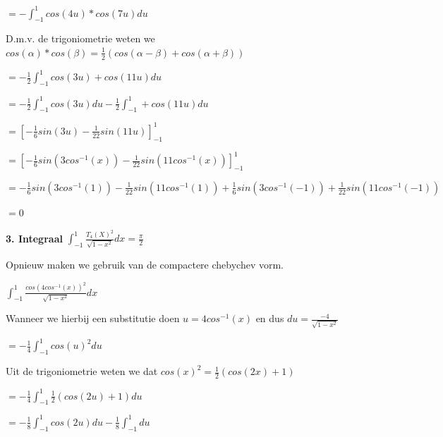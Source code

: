 \documentclass{article}
\begin{document}
\begin{flushleft}
$ = - \int_{-1}^{1}  cos(4u) * cos(7u)  du $
\newline

D.m.v. de trigoniometrie weten we $ cos(\alpha)*cos(\beta) = \frac{1}{2}(cos(\alpha - \beta) + cos(\alpha + \beta))$
\newline

$ = -\frac{1}{2} \int_{-1}^{1}  cos(3u) + cos(11u)  du $
\newline

$ = -\frac{1}{2} \int_{-1}^{1}  cos(3u) du -\frac{1}{2} \int_{-1}^{1} + cos(11u)  du $
\newline

$ = [-\frac{1}{6} sin(3u) - \frac{1}{22} sin(11u)]^{1}_{-1} $
\newline

$ = [-\frac{1}{6} sin(3cos^{-1}(x)) - \frac{1}{22} sin(11cos^{-1}(x))]^{1}_{-1} $
\newline

$ = -\frac{1}{6} sin(3cos^{-1}(1)) - \frac{1}{22} sin(11cos^{-1}(1)) + \frac{1}{6} sin(3cos^{-1}(-1)) + \frac{1}{22} sin(11cos^{-1}(-1)) $
\newline

$ = 0 $
\newline

\textbf{3. Integraal}
$ \int_{-1}^{1}  \frac{T_{4}(X)^{2}}{\sqrt{1-x^{2}}} dx = \frac{\pi}{2} $
\newline

Opnieuw maken we gebruik van de compactere chebychev vorm.
\newline

$ \int_{-1}^{1}  \frac{ cos(4cos^{-1}(x))^{2} }{\sqrt{1-x^{2}}} dx $
\newline

Wanneer we hierbij een substitutie doen $u = 4cos^{-1}(x) $ en dus $ du = \frac{-4}{\sqrt{1-x^{2}}} $
\newline

$ = -\frac{1}{4} \int_{-1}^{1}   cos(u)^{2} du $
\newline

Uit de trigoniometrie weten we dat $cos(x)^{2} = \frac{1}{2}(cos(2x) + 1)$
\newline

$ = -\frac{1}{4} \int_{-1}^{1}   \frac{1}{2}(cos(2u) + 1) du $
\newline

$ = -\frac{1}{8} \int_{-1}^{1}  cos(2u) du -\frac{1}{8} \int_{-1}^{1}  du $
\newline


\end{flushleft}
\end{document}
